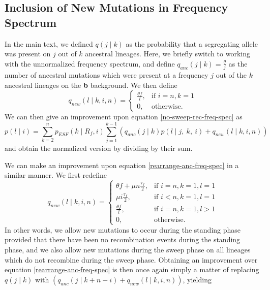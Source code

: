 \documentclass[a4paper,10pt]{article}
\begin{document}
\subsection{Inclusion of New Mutations in Frequency Spectrum}
In the main text, we defined $q(j \mid k)$ as the probability that a segregating allele was present on $j$ out of $k$ ancestral lineages. Here, we briefly switch to working with the unnormalized frequency spectrum, and define $q_{anc}(j \mid k) = \frac{\theta}{j}$ as the number of ancestral mutations which were present at a frequency $j$ out of the $k$ ancestral lineages on the \textbf{b} background. We then define 
\begin{equation}
	q_{new}(l \mid k, i, n) =
	\begin{cases} 
		\frac{\theta f}{l}, 	& \text{if } i = n, k = 1 \\
		0, 				& \text{otherwise}.
	\end{cases}
\end{equation}
We can then give an improvement upon equation \eqref{no-sweep-rec-freq-spec} as
\begin{equation}
	p(l \mid i) =  \sum_{k=2}^{n}  p_{ESF}(k \mid R_f,i)  \sum_{j=1}^{k-1} \left(q_{anc}(j\mid k)p(l \mid j,~k, ~i)  + q_{new}(l \mid k,i,n) \right)
\end{equation}
and obtain the normalized version by dividing by their sum.

We can make an improvement upon equation \eqref{rearrange-anc-freq-spec} in a similar manner. We first redefine
\begin{equation}
	q_{new}(l \mid k, i, n) =
	\begin{cases} 
		\theta f + \mu n\frac{\tau_f}{2}, 	& \text{if } i = n, k = 1, l=1 \\
		\mu i\frac{\tau_f}{2},			& \text{if } i < n, k = 1, l =1 \\
		\frac{\theta f}{l},		& \text{if } i = n, k = 1, l > 1\\
		0, 				& \text{otherwise}.
	\end{cases}
\end{equation}
In other words, we allow new mutations to occur during the standing phase provided that there have been no recombination events during the standing phase, and we also allow new mutations during the sweep phase on all lineages which do not recombine during the sweep phase. Obtaining an improvement over equation \eqref{rearrange-anc-freq-spec} is then once again simply a matter of replacing $q(j \mid k)$ with $\left(q_{anc}(j\mid k+n-i) + q_{new}(l \mid k,i,n)\right)$, yielding
\end{document}
